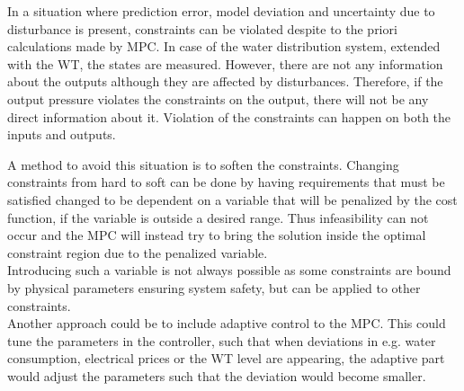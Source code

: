In a situation where prediction error, model deviation and uncertainty due to disturbance is present, constraints can be violated despite to the priori calculations made by MPC. In case of the water distribution system, extended with the WT, the states are measured. However, there are not any information about the outputs although they are affected by disturbances. Therefore, if the output pressure violates the constraints on the output, there will not be any direct information about it. Violation of the constraints can happen on both the inputs and outputs.

A method to avoid this situation is to soften the constraints. Changing constraints from hard to soft can be done by having requirements that must be satisfied changed to be dependent on a variable that will be penalized by the cost function, if the variable is outside a desired range. Thus infeasibility can not occur and the MPC will instead try to bring the solution inside the optimal constraint region due to the penalized variable.\\   
Introducing such a variable is not always possible as some constraints are bound by physical parameters ensuring system safety, but can be applied to other constraints.\\

Another approach could be to include adaptive control to the MPC. This could tune the parameters in the controller, such that when deviations in e.g. water consumption, electrical prices or the WT level are appearing, the adaptive part would adjust the parameters such that the deviation would become smaller.






